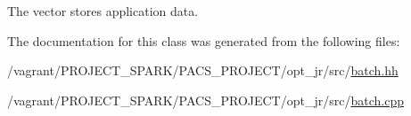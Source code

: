 The vector stores application data. 



The documentation for this class was generated from the following files\-:\begin{DoxyCompactItemize}
\item 
/vagrant/\-P\-R\-O\-J\-E\-C\-T\-\_\-\-S\-P\-A\-R\-K/\-P\-A\-C\-S\-\_\-\-P\-R\-O\-J\-E\-C\-T/opt\-\_\-jr/src/\hyperlink{batch_8hh}{batch.\-hh}\item 
/vagrant/\-P\-R\-O\-J\-E\-C\-T\-\_\-\-S\-P\-A\-R\-K/\-P\-A\-C\-S\-\_\-\-P\-R\-O\-J\-E\-C\-T/opt\-\_\-jr/src/\hyperlink{batch_8cpp}{batch.\-cpp}\end{DoxyCompactItemize}

